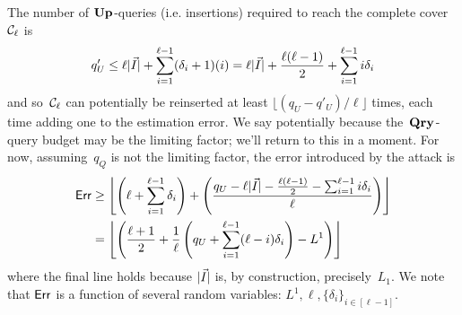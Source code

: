 The number of $\textup{\textbf{Up}}\hspace{0.5pt}$-queries (i.e. insertions) required to reach the complete cover~$\mathcal{C}_\ell$ is 
\[
q'_U \leq \ell|\vec{I}| + \sum_{i=1}^{\ell-1}(\delta_i + 1)(i) = \ell|\vec{I}| + \frac{\ell(\ell-1)}{2} + \sum_{i=1}^{\ell-1} i \delta_i
\]
and so~$\mathcal{C}_\ell$ can potentially be reinserted at least $\lfloor (q_U - q'_U)/\ell \rfloor$ times, each time adding one to the estimation error.  We say potentially because the~$\textup{\textbf{Qry}}\hspace{0.5pt}$-query budget may be the limiting factor; we'll return to this in a moment.  For now, assuming~$q_Q$ is not the limiting factor, the error introduced by the attack is
\begin{align*}
	\mathsf{Err} &\geq \left\lfloor \left( \ell + \sum_{i=1}^{\ell-1}\delta_i \right) + \left( \frac{q_U - \ell|\vec{I}| - \frac{\ell(\ell-1)}{2} - \sum_{i=1}^{\ell-1} i \delta_i}{\ell} \right) \right\rfloor\\
	&= \left\lfloor \left( \frac{\ell+1}{2} + \frac{1}{\ell}\left(q_U + \sum_{i=1}^{\ell-1}(\ell-i)\delta_i \right) - L^1 \right) \right\rfloor
\end{align*}
where the final line holds because $|\vec{I}|$ is, by construction, precisely~$L_1$.  We note that $\mathsf{Err}$ is a function of several random variables: $L^1, \ell, \{\delta_i\}_{i \in [\ell-1]}$.  

